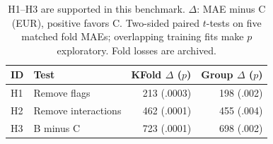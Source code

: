 \begin{table}[h!]
\centering\footnotesize\setlength{\tabcolsep}{2pt}
\begin{tabular}{llrr}
\toprule
ID & Test & KFold $\Delta$ ($p$) & Group $\Delta$ ($p$)\\
\midrule
H1 & Remove flags & 213 (.0003) & 198 (.002)\\
H2 & Remove interactions & 462 (.0001) & 455 (.004)\\
H3 & B minus C & 723 (.0001) & 698 (.002)\\
\bottomrule
\end{tabular}
\caption{H1--H3 are supported in this benchmark. $\Delta$: MAE minus C (EUR), positive favors C. Two-sided paired $t$-tests on five matched fold MAEs; overlapping training fits make $p$ exploratory. Fold losses are archived.}
\label{tab:hyp}
\end{table}

